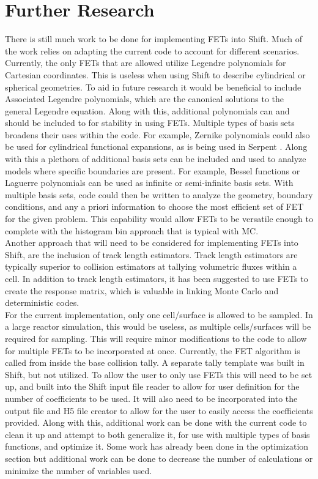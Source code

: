 \documentclass[10tma4paper]{article}
\begin{document}
\section{Further Research}\label{further}
There is still much work to be done for implementing FETs into Shift. Much of the work relies on adapting the current code to account for different scenarios. Currently, the only FETs that are allowed utilize Legendre polynomials for Cartesian coordinates. This is useless when using Shift to describe cylindrical or spherical geometries. To aid in future research it would be beneficial to include Associated Legendre polynomials, which are the canonical solutions to the general Legendre equation. Along with this, additional polynomials can and should be included to for stability in using FETs. Multiple types of basis sets broadens their uses within the code. For example, Zernike polynomials could also be used for cylindrical functional expansions, as is being used in Serpent \cite{AdvancementSerpent}\cite{PreliminarySerpent}. Along with this a plethora of additional basis sets can be included and used to analyze models where specific boundaries are present. For example, Bessel functions or Laguerre polynomials can be used as infinite or semi-infinite basis sets. With multiple basis sets, code could then be written to analyze the geometry, boundary conditions, and any a priori information to choose the most efficient set of FET for the given problem. This capability would allow FETs to be versatile enough to complete with the histogram bin approach that is typical with MC.
\\
Another approach that will need to be considered for implementing FETs into Shift, are the inclusion of track length estimators. Track length estimators are typically superior to collision estimators at tallying volumetric fluxes within a cell. In addition to track length estimators, it has been suggested to use FETs to create the response matrix, which is valuable in linking Monte Carlo and deterministic codes.
\\
For the current implementation, only one cell/surface is allowed to be sampled. In a large reactor simulation, this would be useless, as multiple cells/surfaces will be required for sampling. This will require minor modifications to the code to allow for multiple FETs to be incorporated at once. Currently, the FET algorithm is called from inside the base collision tally. A separate tally template was built in Shift, but not utilized. To allow the user to only use FETs this will need to be set up, and built into the Shift input file reader to allow for user definition for the number of coefficients to be used. It will also need to be incorporated into the output file and H5 file creator to allow for the user to easily access the coefficients provided. Along with this, additional work can be done with the current code to clean it up and attempt to both generalize it, for use with multiple types of basis functions, and optimize it. Some work has already been done in the optimization section but additional work can be done to decrease the number of calculations or minimize the number of variables used.



\end{document}
